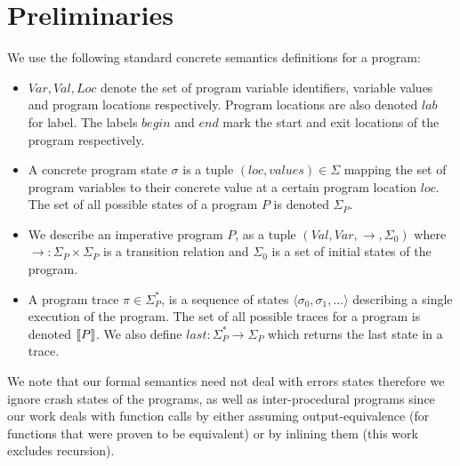 \section{Preliminaries} 
We use the following standard concrete semantics definitions for a program:
\begin{itemize}
\item $Var,Val,Loc$ denote the set of program variable identifiers, variable values and program locations respectively. Program locations are also denoted $lab$ for label. The labels $begin$ and $end$ mark the start and exit locations of the program respectively.
\item A concrete program state $\sigma$ is a tuple $(loc, values) \in \Sigma$ mapping the set of program variables to their concrete value at a certain program location $loc$. The set of all possible states of a program $P$ is denoted $\Sigma_{P}$.
\item We describe an imperative program $P$, as a tuple $(Val,Var,\rightarrow,\Sigma_{0})$ where $\rightarrow : \Sigma_{P} \times \Sigma_{P} $  is a transition relation and $\Sigma_{0}$ is a set of initial states of the program.
\item A program trace $\pi \in \Sigma^*_{P}$, is a sequence of states $\langle \sigma_0,\sigma_1,... \rangle$ describing a single execution of the program. The set of all possible traces for a program is denoted $\lbrack\!\lbrack P \rbrack\!\rbrack$. We also define $last : \Sigma_{P}^* \rightarrow \Sigma_{P}$ which returns the last state in a trace.
\end{itemize}

%

\begin{sloppypar}
We note that our formal semantics need not deal with errors states therefore we ignore crash states of the programs, as well as inter-procedural programs since our work deals with function calls by either assuming output-equivalence (for functions that were proven to be equivalent) or by inlining them (this work excludes recursion).
\end{sloppypar}

